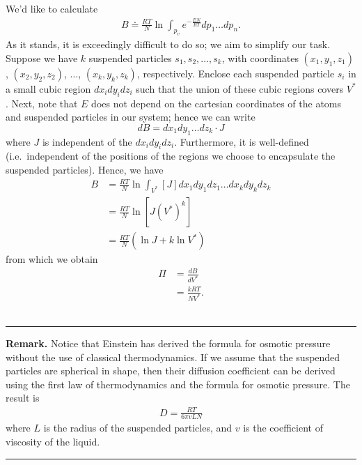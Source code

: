 \documentclass[12pt,reqno]{amsart}
\theoremstyle{plain}  %
\theoremstyle{definition}
\begin{document}
We'd like to calculate 
\begin{equation*}
  \begin{split}
    B \doteq \frac{RT}{N}\ln \int_{p_v} e^{-\frac{EN}{RT}}dp_1\dots dp_n.
    \label{B}
  \end{split}
\end{equation*}
As it stands, it is exceedingly
difficult to do so; we aim to simplify our task. Suppose we have $k$
suspended particles $s_1, s_2, \dots, s_k$, with coordinates $(x_1, y_1, z_1)$, $(x_2, y_2, z_2)$, $\dots$,
$(x_k, y_k, z_k)$, respectively. Enclose each suspended particle $s_i$ in a small cubic region $dx_i dy_i dz_i$ such that the union of these cubic regions covers $V^*$. Next, note
that $E$ does not depend on the cartesian coordinates of the atoms and suspended
particles in our system; hence we can write
\begin{equation*}
  dB = dx_1 dy_1\dots dz_k \cdot J
\end{equation*}
where $J$ is independent of the $dx_i dy_i dz_i$. Furthermore, it is well-defined (i.e.\
independent of the positions of the regions we choose to encapsulate the suspended
particles). Hence, we have
\begin{equation*}
  \begin{split}
    B & = \frac{RT}{N} \ln
    \int_{V^*} \left[ J \right] dx_1dy_1dz_1\dots dx_k dy_k dz_k
    \\
    & = \frac{RT}{N} \ln \left[ J(V^*)^k \right]
    \\
    & = \frac{RT}{N}(\ln J + k \ln V^*)
    \label{simplified-B}
  \end{split}
\end{equation*}
from which we obtain
\begin{equation*}
  \begin{split}
    \Pi & = \frac{dB}{dV^*}
    \\
    & = \frac{kRT}{NV^*}.
    \label{pressure-from-molecular-heat}
  \end{split}
\end{equation*}
\\
\hrule
{\bf Remark.} Notice that Einstein has derived the formula for osmotic pressure
without the use of classical thermodynamics. If we assume that the suspended particles
are spherical in shape, then their diffusion coefficient can be derived using the first
law of thermodynamics and the formula for osmotic pressure. The result is 
\begin{equation}
  \begin{split}
    D = \frac{RT}{6 \pi v L N}
    \label{diffusion-coefficient}
  \end{split}
\end{equation}
where $L$ is the radius of the suspended particles, and $v$ is the coefficient of
viscosity of the liquid.
\\
\hrule
\end{document}

